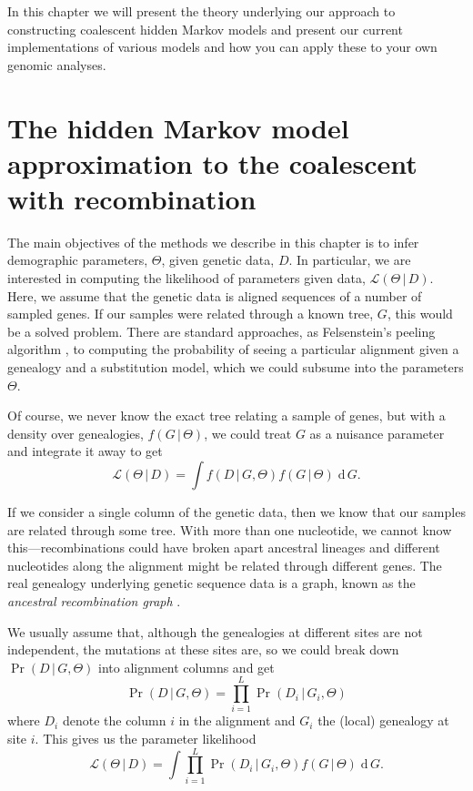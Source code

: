 \documentclass[graybox]{svmult}
\newcommand{\G}{\ensuremath{G}}
\renewcommand{\D}{\ensuremath{D}}
\renewcommand{\lhd}{\ensuremath{\mathcal{L}}}
\newcommand{\intd}{\ensuremath{\mathrm{\;d\,}}}
\begin{document}
In this chapter we will present the theory underlying our approach to constructing coalescent hidden Markov models and present our current implementations of various models and how you can apply these to your own genomic analyses.

\section{The hidden Markov model approximation to the coalescent with recombination}

The main objectives of the methods we describe in this chapter is to infer demographic parameters, $\Theta$, given genetic data, $D$. In particular, we are interested in computing the likelihood of parameters given data, $\lhd(\Theta\,|\,D)$. Here, we assume that the genetic data is aligned sequences of a number of sampled genes. If our samples were related through a known tree, $\G$, this would be a solved problem. There are standard approaches, as Felsenstein's peeling algorithm \cite{Felsenstein_1981}, to computing the probability of seeing a particular alignment given a genealogy and a substitution model, which we could subsume into the parameters $\Theta$.

Of course, we never know the exact tree relating a sample of genes, but with a density over genealogies, $f(\G\,|\,\Theta)$, we could treat $\G$ as a nuisance parameter and integrate it away to get
\begin{equation}
    \lhd(\Theta\,|\,\D) = \int f(\D\,|\,\G,\Theta) f(\G\,|\,\Theta) \intd\G .
\end{equation}

If we consider a single column of the genetic data, then we know that our samples are related through some tree. With more than one nucleotide, we cannot know this---recombinations could have broken apart ancestral lineages and different nucleotides along the alignment might be related through different genes. The real genealogy underlying genetic sequence data is a graph, known as the \emph{ancestral recombination graph} \cite{Hein:2004ta}.

We usually assume that, although the genealogies at different sites are not independent, the mutations at these sites are, so we could break down $\Pr(\D\,|\,\G,\Theta)$ into alignment columns and get
\begin{equation}
  \Pr(\D\,|\,\G,\Theta) =
  \prod_{i=1}^L \Pr(\D_i\,|\,\G_i,\Theta)
\end{equation}
where $\D_i$ denote the column $i$ in the alignment and $\G_i$ the (local) genealogy at site $i$. This gives us the parameter likelihood
\begin{equation}
	\label{eq:likelihood-integral}
    \lhd(\Theta\,|\,\D) = 
    \int \prod_{i=1}^L \Pr(\D_i\,|\,\G_i,\Theta) f(\G\,|\,\Theta) \intd\G .
\end{equation}
\end{document}
